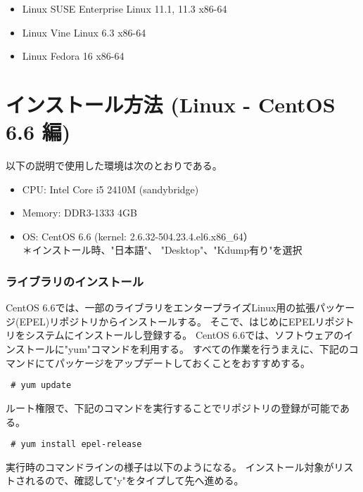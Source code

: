 \begin{itemize}
\item Linux SUSE Enterprise Linux 11.1, 11.3 x86-64
\item Linux Vine Linux 6.3 x86-64
\item Linux Fedora 16 x86-64
\end{itemize}


\section{インストール方法 (Linux - CentOS 6.6 編)}

以下の説明で使用した環境は次のとおりである。
\begin{itemize}
\item CPU: Intel Core i5 2410M (sandybridge)
\item Memory: DDR3-1333 4GB
\item OS: CentOS 6.6 (kernel: 2.6.32-504.23.4.el6.x86\_64）\\
{\small ＊インストール時、"日本語"、 "Desktop"、"Kdump有り"を選択}
\end{itemize}

\subsubsection{ライブラリのインストール}

CentOS 6.6では、一部のライブラリをエンタープライズLinux用の拡張パッケージ(EPEL)リポジトリからインストールする。
そこで、はじめにEPELリポジトリをシステムにインストールし登録する。
CentOS 6.6では、ソフトウェアのインストールに"yum"コマンドを利用する。
すべての作業を行うまえに、下記のコマンドにてパッケージをアップデートしておくことをおすすめする。
\begin{verbatim}
 # yum update
\end{verbatim}

ルート権限で、下記のコマンドを実行することでリポジトリの登録が可能である。
\begin{verbatim}
 # yum install epel-release
\end{verbatim}
実行時のコマンドラインの様子は以下のようになる。
インストール対象がリストされるので、確認して"y"をタイプして先へ進める。\\

